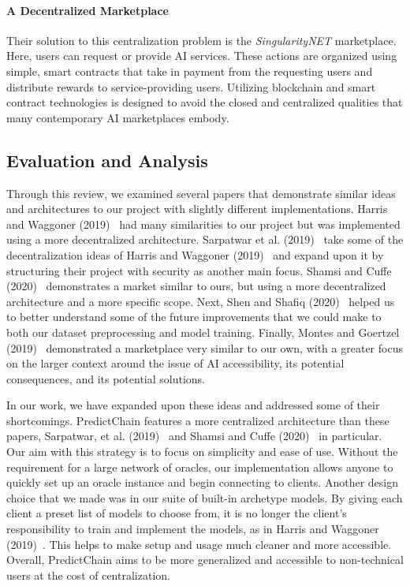 \documentclass{ledger}
\begin{document}
\paragraph{A Decentralized Marketplace}  Their solution to this centralization problem is the \textit{SingularityNET} marketplace.  Here, users can request or provide AI services.  These actions are organized using simple, smart contracts that take in payment from the requesting users and distribute rewards to service-providing users.  Utilizing blockchain and smart contract technologies is designed to avoid the closed and centralized qualities that many contemporary AI marketplaces embody.


\subsection{Evaluation and Analysis}

Through this review, we examined several papers that demonstrate similar ideas and architectures to our project with slightly different implementations.  Harris and Waggoner (2019)~\cite{sharingModels} had many similarities to our project but was implemented using a more decentralized architecture.  Sarpatwar et al. (2019)~\cite{priceOfTrust} take some of the decentralization ideas of Harris and Waggoner (2019)~\cite{sharingModels} and expand upon it by structuring their project with security as another main focus.  Shamsi and Cuffe (2020)~\cite{windForcasting} demonstrates a market similar to ours, but using a more decentralized architecture and a more specific scope.  Next, Shen and Shafiq (2020)~\cite{deepPrediction} helped us to better understand some of the future improvements that we could make to both our dataset preprocessing and model training.  Finally, Montes and Goertzel (2019)~\cite{democratizedAI} demonstrated a marketplace very similar to our own, with a greater focus on the larger context around the issue of AI accessibility, its potential consequences, and its potential solutions.

In our work, we have expanded upon these ideas and addressed some of their shortcomings.  PredictChain features a more centralized architecture than these papers, Sarpatwar, et al. (2019)~\cite{priceOfTrust} and Shamsi and Cuffe (2020)~\cite{windForcasting} in particular. Our aim with this strategy is to focus on simplicity and ease of use.  Without the requirement for a large network of oracles, our implementation allows anyone to quickly set up an oracle instance and begin connecting to clients.  Another design choice that we made was in our suite of built-in archetype models.  By giving each client a preset list of models to choose from, it is no longer the client's responsibility to train and implement the models, as in Harris and Waggoner (2019)~\cite{sharingModels}.  This helps to make setup and usage much cleaner and more accessible.  Overall, PredictChain aims to be more generalized and accessible to non-technical users at the cost of centralization.
\end{document}
